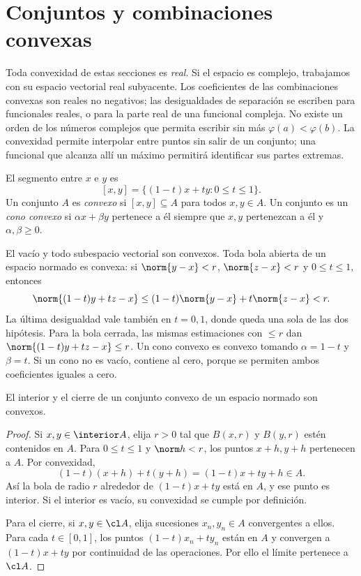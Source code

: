 \section{Conjuntos y combinaciones convexas}\label{lectura:24}

Toda convexidad de estas secciones es \emph{real}. Si el espacio es complejo, trabajamos con su espacio vectorial real subyacente. Los coeficientes de las combinaciones convexas son reales no negativos; las desigualdades de separación se escriben para funcionales reales, o para la parte real de una funcional compleja. No existe un orden de los números complejos que permita escribir sin más $\varphi(a)<\varphi(b)$. La convexidad permite interpolar entre puntos sin salir de un conjunto; una funcional que alcanza allí un máximo permitirá identificar sus partes extremas.



\begin{definicion}
El segmento entre $x$ e $y$ es
\[
 [x,y]=\{(1-t)x+ty:0\leq t\leq1\}.
\]
Un conjunto $A$ es \emph{convexo} si $[x,y]\subseteq A$ para todos $x,y\in A$. Un conjunto es un \emph{cono convexo} si $\alpha x+\beta y$ pertenece a él siempre que $x,y$ pertenezcan a él y $\alpha,\beta\geq0$.
\end{definicion}

\begin{ejemplo}
El vacío y todo subespacio vectorial son convexos. Toda bola abierta de un espacio normado es convexa: si $\norm{y-x}<r$, $\norm{z-x}<r$ y $0\leq t\leq1$, entonces
\[
 \norm{(1-t)y+tz-x}\leq(1-t)\norm{y-x}+t\norm{z-x}<r.
\]
La última desigualdad vale también en $t=0,1$, donde queda una sola de las dos hipótesis. Para la bola cerrada, las mismas estimaciones con $\leq r$ dan $\norm{(1-t)y+tz-x}\leq r$. Un cono convexo es convexo tomando $\alpha=1-t$ y $\beta=t$. Si un cono no es vacío, contiene al cero, porque se permiten ambos coeficientes iguales a cero.
\end{ejemplo}

\begin{proposicion}\label{ch24:interior-cierre}
El interior y el cierre de un conjunto convexo de un espacio normado son convexos.
\end{proposicion}
\begin{proof}
Si $x,y\in\interior A$, elija $r>0$ tal que $B(x,r)$ y $B(y,r)$ estén contenidos en $A$. Para $0\leq t\leq1$ y $\norm h<r$, los puntos $x+h,y+h$ pertenecen a $A$. Por convexidad,
\[
 (1-t)(x+h)+t(y+h)=(1-t)x+ty+h\in A.
\]
Así la bola de radio $r$ alrededor de $(1-t)x+ty$ está en $A$, y ese punto es interior. Si el interior es vacío, su convexidad se cumple por definición.

Para el cierre, si $x,y\in\cl A$, elija sucesiones $x_n,y_n\in A$ convergentes a ellos. Para cada $t\in[0,1]$, los puntos $(1-t)x_n+ty_n$ están en $A$ y convergen a $(1-t)x+ty$ por continuidad de las operaciones. Por ello el límite pertenece a $\cl A$.
\end{proof}

